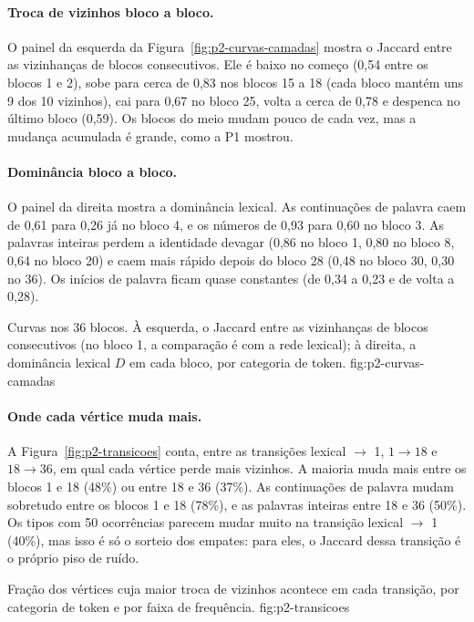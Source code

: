 \paragraph{Troca de vizinhos bloco a bloco.} O painel da esquerda da
Figura~\ref{fig:p2-curvas-camadas} mostra o Jaccard entre as vizinhanças de blocos
consecutivos. Ele é baixo no começo (0,54 entre os blocos 1 e 2), sobe para cerca de 0,83 nos
blocos 15 a 18 (cada bloco mantém uns 9 dos 10 vizinhos), cai para 0,67 no bloco 25, volta a
cerca de 0,78 e despenca no último bloco (0,59). Os blocos do meio mudam pouco de cada vez, mas
a mudança acumulada é grande, como a P1 mostrou.

\paragraph{Dominância bloco a bloco.} O painel da direita mostra a dominância lexical. As
continuações de palavra caem de 0,61 para 0,26 já no bloco 4, e os números de 0,93 para 0,60
no bloco 3. As palavras inteiras perdem a identidade devagar (0,86 no bloco 1, 0,80 no bloco 8,
0,64 no bloco 20) e caem mais rápido depois do bloco 28 (0,48 no bloco 30, 0,30 no 36). Os
inícios de palavra ficam quase constantes (de 0,34 a 0,23 e de volta a 0,28).

    {Curvas nos 36 blocos. À esquerda, o Jaccard entre as vizinhanças de blocos consecutivos
    (no bloco 1, a comparação é com a rede lexical); à direita, a dominância lexical $D$ em cada
    bloco, por categoria de token.}
    {fig:p2-curvas-camadas}

\paragraph{Onde cada vértice muda mais.} A Figura~\ref{fig:p2-transicoes} conta, entre as
transições lexical $\to$ 1, $1\to18$ e $18\to36$, em qual cada vértice perde mais vizinhos. A
maioria muda mais entre os blocos 1 e 18 (48\%) ou entre 18 e 36 (37\%). As continuações de
palavra mudam sobretudo entre os blocos 1 e 18 (78\%), e as palavras inteiras entre 18 e 36
(50\%). Os tipos com 50 ocorrências parecem mudar muito na transição lexical $\to$ 1 (40\%),
mas isso é só o sorteio dos empates: para eles, o Jaccard dessa transição é o próprio piso de
ruído.

    {Fração dos vértices cuja maior troca de vizinhos acontece em cada transição, por
    categoria de token e por faixa de frequência.}
    {fig:p2-transicoes}

